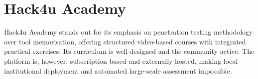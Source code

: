 \section{Hack4u Academy}

Hack4u Academy \cite{hack4u} stands out for its emphasis on penetration testing methodology over
tool memorisation, offering structured video-based courses with integrated practical exercises.
Its curriculum is well-designed and the community active. The platform is, however,
subscription-based and externally hosted, making local institutional deployment and automated
large-scale assessment impossible.
